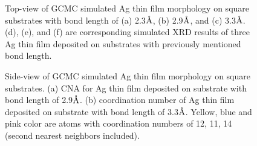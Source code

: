 \begin{figure}[!ht]
  \label{Chap:Ag/ZnO:fig:10f}

\caption[GCMC simulation results of Ag thin film morphology on square substrates.]{Top-view of \ac{GCMC} simulated Ag thin film morphology on square substrates with bond length of (a) 2.3$\mbox{\normalfont\AA}$, (b) 2.9$\mbox{\normalfont\AA}$, and (c) 3.3$\mbox{\normalfont\AA}$. (d), (e), and (f) are corresponding simulated \ac{XRD} results of three Ag thin film  deposited on substrates with previously mentioned bond length.}
  \label{Chap:Ag/ZnO:fig10-1}
\end{figure}
\endgroup


\begingroup
\begin{figure}[!ht]
  \centering
  \label{Chap:Ag/ZnO:fig:10g}
  \label{Chap:Ag/ZnO:fig:10h}
\caption[Side-view of \ac{GCMC} simulated Ag thin film morphology on square substrates.]{Side-view of \ac{GCMC} simulated Ag thin film morphology on square substrates. (a) \ac{CNA} for Ag thin film deposited on substrate with bond length of 2.9$\mbox{\normalfont\AA}$. (b) coordination number of Ag thin film deposited on substrate with bond length of 3.3$\mbox{\normalfont\AA}$. Yellow, blue and pink color are atoms with coordination numbers of 12, 11, 14 (second nearest neighbors included).}
  \label{Chap:Ag/ZnO:fig10-3}
\end{figure}
\endgroup

